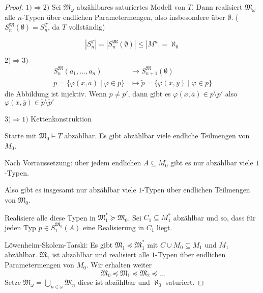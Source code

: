 \documentclass[12pt,parskip=full]{scrartcl}
\newcommand{\abs}[1]{{\left| #1 \right|}}
\newcommand{\heading}{\underline}
\theoremstyle{definition}
\begin{document}
	\begin{proof}
		\heading{$1) \Rightarrow 2)$} Sei $\mathfrak{M}_\omega$ abzählbares saturiertes Modell von $T$. Dann realisiert $\mathfrak{M}_\omega$ alle $n$-Typen über endlichen Parametermengen, also insbesondere über $\emptyset$. ($S_n^\mathfrak{M}(\emptyset) = S_n^T$, da $T$ vollständig)
		
		\begin{equation*}
			\abs{S_n^T} = \abs{S_n^\mathfrak{M}(\emptyset)} \leq \abs{M^n} = \aleph_0
		\end{equation*}
		
		\heading{$2) \Rightarrow 3)$}
		\begin{align*}
			S_n^\mathfrak{M}(a_1, \dots, a_n) &\to S_{n+1}^\mathfrak{M}(\emptyset) \\p = \{ \varphi(x, \overline{a}) \mid \varphi \in p \} &\mapsto \tilde{p} = \{ \varphi(x, \overline{y}) \mid \varphi \in p \}
		\end{align*}
		die Abbildung ist injektiv. Wenn $p \neq p'$, dann gibt es $\varphi(x, \overline{a}) \in p \setminus p'$ also $\varphi(x, \overline{y}) \in \tilde{p} \setminus \tilde{p}'$
		
		\heading{$3) \Rightarrow 1)$} Kettenkonstruktion
		
		Starte mit $\mathfrak{M}_0 \models T$ abzählbar. Es gibt abzählbar viele endliche Teilmengen von $M_0$.
		
		Nach Vorraussetzung: über jedem endlichen $A \subseteq M_0$ gibt es nur abzählbar viele $1$-Typen.
		
		Also gibt es insgesamt nur abzählbar viele $1$-Typen über endlichen Teilmengen von $\mathfrak{M}_0$.
		
		Realisiere alle diese Typen in $\mathfrak{M}_1^* \succcurlyeq \mathfrak{M}_0$. Sei $C_1 \subseteq M_1^*$ abzählbar und so, dass für jeden Typ $p \in S_1^{\mathfrak{M}_0}(A)$ eine Realisierung in $C_1$ liegt.
		
		Löwenheim-Skolem-Tarski: Es gibt $\mathfrak{M_1} \preccurlyeq \mathfrak{M}_1^*$ mit $C \cup M_0 \subseteq M_1$ und $M_1$ abzählbar. $\mathfrak{M}_1$ ist abzählbar und realisiert alle $1$-Typen über endlichen Parametermengen von $M_0$. Wir erhalten weiter
		\begin{equation*}
			\mathfrak{M}_0 \preccurlyeq \mathfrak{M}_1 \preccurlyeq \mathfrak{M}_2 \preccurlyeq \dots
		\end{equation*}
		Setze $\mathfrak{M}_\omega = \bigcup_{n \in \omega} \mathfrak{M}_n$ diese ist abzählbar und $\aleph_0$-saturiert.
	\end{proof}
\end{document}
